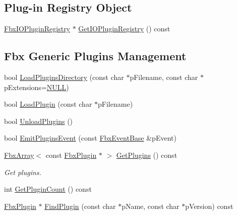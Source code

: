 \subsection*{Plug-\/in Registry Object}
\begin{DoxyCompactItemize}
\item 
\hyperlink{class_fbx_i_o_plugin_registry}{Fbx\+I\+O\+Plugin\+Registry} $\ast$ \hyperlink{class_fbx_manager_ae6cc5dd81a15ec63c7c8102d349231d8}{Get\+I\+O\+Plugin\+Registry} () const
\end{DoxyCompactItemize}
\subsection*{Fbx Generic Plugins Management}
\begin{DoxyCompactItemize}
\item 
bool \hyperlink{class_fbx_manager_a86e610934144baea58ef98f4b4968e2e}{Load\+Plugins\+Directory} (const char $\ast$p\+Filename, const char $\ast$p\+Extensions=\hyperlink{fbxarch_8h_a070d2ce7b6bb7e5c05602aa8c308d0c4}{N\+U\+LL})
\item 
bool \hyperlink{class_fbx_manager_ae6c88deb7290a59dcf93ef6aaecd9a1c}{Load\+Plugin} (const char $\ast$p\+Filename)
\item 
bool \hyperlink{class_fbx_manager_ac088e1b925b4576e9221f48533edee98}{Unload\+Plugins} ()
\item 
bool \hyperlink{class_fbx_manager_a82145985af0000ad13ff22e4e28e29a3}{Emit\+Plugins\+Event} (const \hyperlink{class_fbx_event_base}{Fbx\+Event\+Base} \&p\+Event)
\item 
\hyperlink{class_fbx_array}{Fbx\+Array}$<$ const \hyperlink{class_fbx_plugin}{Fbx\+Plugin} $\ast$ $>$ \hyperlink{class_fbx_manager_a0b53702773e0a9b9bf283a315f7f2dce}{Get\+Plugins} () const
\begin{DoxyCompactList}\small\item\em Get plugins. \end{DoxyCompactList}\item 
int \hyperlink{class_fbx_manager_a580c44f170d7e41060891fccb3710d21}{Get\+Plugin\+Count} () const
\item 
\hyperlink{class_fbx_plugin}{Fbx\+Plugin} $\ast$ \hyperlink{class_fbx_manager_accc3ab301611096bdce88b9fd6b9cb57}{Find\+Plugin} (const char $\ast$p\+Name, const char $\ast$p\+Version) const
\end{DoxyCompactItemize}
